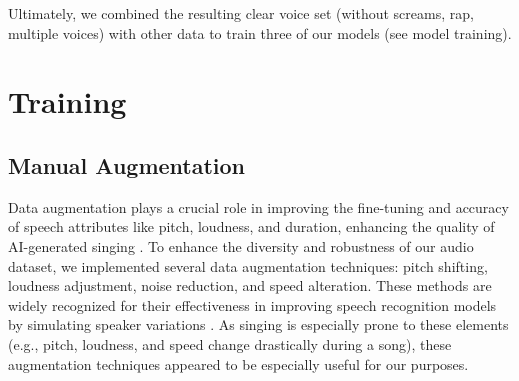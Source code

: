 \documentclass[a4paper]{article}
\begin{document}
Ultimately, we combined the resulting clear voice set (without screams, rap, multiple voices) with other data to train three of our models (see model training).






\section{Training}

\subsection{Manual Augmentation}

Data augmentation plays a crucial role in improving the fine-tuning and accuracy of speech attributes like pitch, loudness, and duration, enhancing the quality of AI-generated singing \cite{Morrison2024}.
To enhance the diversity and robustness of our audio dataset, we implemented several data augmentation techniques: pitch shifting, loudness adjustment, noise reduction, and speed alteration. These methods are widely recognized for their effectiveness in improving speech recognition models by simulating speaker variations \cite{Morrison2024}. As singing is especially prone to these elements (e.g., pitch, loudness, and speed change drastically during a song), these augmentation techniques appeared to be especially useful for our purposes.
\end{document}
